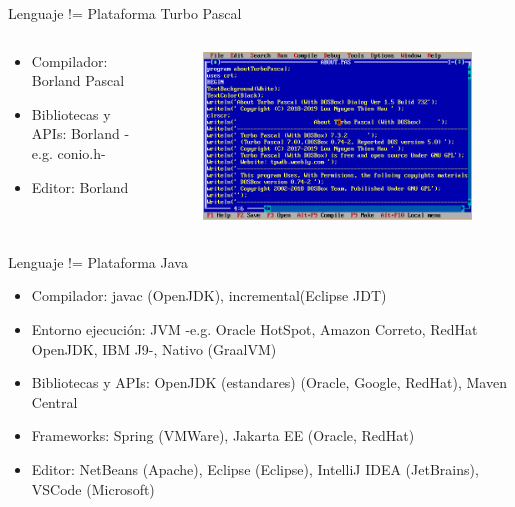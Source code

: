 \documentclass[aspectratio=169]{beamer}
\begin{document}
\begin{frame}{Lenguaje != Plataforma}
    Turbo Pascal

    \begin{columns}[T] %
	     \begin{column}[T]{0.5\textwidth} %
            \begin{itemize}
                \item Compilador: Borland Pascal
                \item Bibliotecas y APIs: Borland -e.g. conio.h-
                \item Editor: Borland
            \end{itemize}
	     \end{column}
	     \begin{column}[T]{7cm} %
   			\begin{figure}
   			\centering
   			\includegraphics[width=\linewidth]{Images/pascal}
   			\end{figure}

	     \end{column}
     \end{columns}
\end{frame}

\begin{frame}{Lenguaje != Plataforma}
    Java
	\begin{itemize}
	\item Compilador: javac (OpenJDK), incremental(Eclipse JDT)
    \item Entorno ejecución: JVM -e.g. Oracle HotSpot, Amazon Correto, RedHat OpenJDK, IBM J9-, Nativo (GraalVM)
    \item Bibliotecas y APIs: OpenJDK (estandares) (Oracle, Google, RedHat), Maven Central
    \item Frameworks: Spring (VMWare), Jakarta EE (Oracle, RedHat)
    \item Editor: NetBeans (Apache), Eclipse (Eclipse), IntelliJ IDEA (JetBrains), VSCode (Microsoft)
	\end{itemize}
\end{frame}
\end{document}
